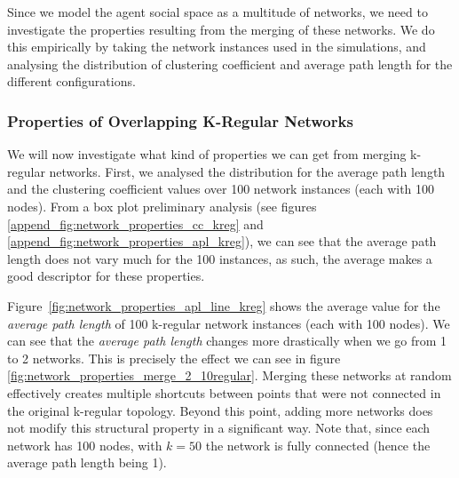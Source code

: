 \documentclass[preprint,number]{elsarticle}
\begin{document}
        Since we model the agent social space as a multitude of networks, we need to investigate the
        properties resulting from the merging of these networks. We do this empirically by taking
        the network instances used in the simulations, and analysing the distribution of clustering
        coefficient and average path length for the different configurations.

        \subsubsection{Properties of Overlapping K-Regular Networks}
        \label{sec:overlapping_kreg}
        \noindent We will now investigate what kind of properties we can get from merging k-regular
        networks. First, we analysed the distribution for the average path length and the clustering
        coefficient values over 100 network instances (each with 100 nodes). From a box plot
        preliminary analysis (see figures \ref{append_fig:network_properties_cc_kreg} and
        \ref{append_fig:network_properties_apl_kreg}), we can see that the average path length does
        not vary much for the 100 instances, as such, the average makes a good descriptor for these
        properties.

        Figure~\ref{fig:network_properties_apl_line_kreg} shows the average value for the
        \textit{average path length} of 100 k-regular network instances (each with 100 nodes). We
        can see that the \textit{average path length} changes more drastically when we go from 1 to
        2 networks. This is precisely the effect we can see in figure
        \ref{fig:network_properties_merge_2_10regular}. Merging these networks at random effectively
        creates multiple shortcuts between points that were not connected in the original k-regular
        topology. Beyond this point, adding more networks does not modify this structural property
        in a significant way. Note that, since each network has 100 nodes, with $k=50$ the network
        is fully connected (hence the average path length being 1).
\end{document}
